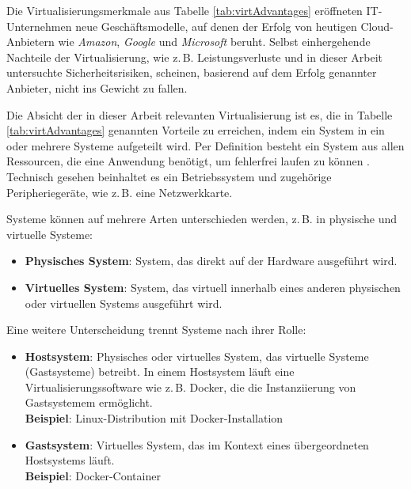 \documentclass[../main.tex]{subfiles}
\begin{document}
		Die Virtualisierungsmerkmale aus Tabelle \ref{tab:virtAdvantages} eröffneten IT-Unternehmen neue Geschäftsmodelle, auf denen der Erfolg von heutigen Cloud-Anbietern wie \emph{Amazon}, \emph{Google} und \emph{Microsoft} beruht. Selbst einhergehende Nachteile der Virtualisierung, wie z.\,B. Leistungsverluste und in dieser Arbeit untersuchte Sicherheitsrisiken, scheinen, basierend auf dem Erfolg genannter Anbieter, nicht ins Gewicht zu fallen.


		Die Absicht der in dieser Arbeit relevanten Virtualisierung ist es, die in Tabelle \ref{tab:virtAdvantages} genannten Vorteile zu erreichen, indem ein System in ein oder mehrere Systeme aufgeteilt wird. Per Definition besteht ein System aus allen Ressourcen, die eine Anwendung benötigt, um fehlerfrei laufen zu können \cite[S.106]{tanenbaumOS}. Technisch gesehen beinhaltet es ein Betriebssystem und zugehörige Peripheriegeräte, wie z.\,B. eine Netzwerkkarte.

		Systeme können auf mehrere Arten unterschieden werden, z.\,B. in physische und virtuelle Systeme:

		\begin{itemize}
			\item \textbf{Physisches System}: System, das direkt auf der Hardware ausgeführt wird.
			\item \textbf{Virtuelles System}: System, das virtuell innerhalb eines anderen physischen oder virtuellen Systems ausgeführt wird.
		\end{itemize}

		Eine weitere Unterscheidung trennt Systeme nach ihrer Rolle:

		\begin{itemize}
			\item \textbf{Hostsystem}: Physisches oder virtuelles System, das virtuelle Systeme (Gastsysteme) betreibt. In einem Hostsystem läuft eine Virtualisierungssoftware wie z.\,B. Docker, die die Instanziierung von Gastsystemem ermöglicht.\\
			\textbf{Beispiel}: Linux-Distribution mit Docker-Installation
			\item \textbf{Gastsystem}: Virtuelles System, das im Kontext eines übergeordneten Hostsystems läuft.\\
			\textbf{Beispiel}: Docker-Container
		\end{itemize}
\end{document}
